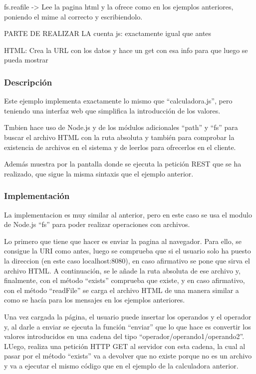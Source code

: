 \documentclass{article}
\begin{document}
fs.reafile -> Lee la pagina html y la ofrece como en los ejemplos anteriores, poniendo el mime al correcto y escribiendolo.

PARTE DE REALIZAR LA cuenta
js:
exactamente igual que antes

HTML:
Crea la URL con los datos y hace un get con esa info para que luego se pueda mostrar

\subsubsection{Descripción}
Este ejemplo implementa exactamente lo mismo que ``calculadora.js'', pero teniendo una interfaz web que simplifica la introducción de los valores.

Tmbien hace uso de Node.js y de los módulos adicionales ``path'' y ``fs'' para buscar el archivo HTML con la ruta absoluta y también para comprobar la existencia de archivos en el sistema y de leerlos para ofrecerlos en el cliente.



Además muestra por la pantalla donde se ejecuta la petición REST que se ha realizado, que sigue la misma sintaxis que el ejemplo anterior.

\subsubsection{Implementación}
La implementacion es muy similar al anterior, pero en este caso se usa el modulo de Node.js ``fs'' para poder realizar operaciones con archivos.

Lo primero que tiene que hacer es enviar la pagina al navegador. Para ello, se consigue la URI como antes, luego se comprueba que si el usuario solo ha puesto la direccion (en este caso localhost:8080), en caso afirmativo se pone que sirva el archivo HTML. A continuación, se le añade la ruta absoluta de ese archivo y, finalmente, con el método ``exists'' comprueba que existe, y en caso afirmativo, con el método ``readFile'' se carga el archivo HTML de una manera similar a como se hacía para los mensajes en los ejemplos anteriores.

Una vez cargada la página, el usuario puede insertar los operandos y el operador y, al darle a enviar se ejecuta la función ``enviar'' que lo que hace es convertir los valores introducidos en una cadena del tipo ``operador/operando1/operando2''. LUego, realiza una petición HTTP GET al servidor con esta cadena, la cual al pasar por el método ``exists'' va a devolver que no existe porque no es un archivo y va a ejecutar el mismo código que en el ejemplo de la calculadora anterior.
\end{document}
